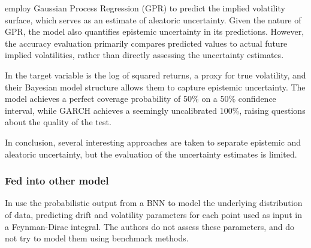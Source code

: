 \textcite{tegner2021probabilistic} employ Gaussian Process Regression (GPR) to predict the implied volatility surface, which serves as an estimate of aleatoric uncertainty. Given the nature of GPR, the model also quantifies epistemic uncertainty in its predictions. However, the accuracy evaluation primarily compares predicted values to actual future implied volatilities, rather than directly assessing the uncertainty estimates.

In \textcite{Parker2021BayesianHeteroskedastic} the target variable is the log of squared returns, a proxy for true volatility, and their Bayesian model structure allows them to capture epistemic uncertainty. The model achieves a perfect coverage probability of 50\% on a 50\% confidence interval, while GARCH achieves a seemingly uncalibrated 100\%, raising questions about the quality of the test.

In conclusion, several interesting approaches are taken to separate epistemic and aleatoric uncertainty, but the evaluation of the uncertainty estimates is limited. 

\subsubsection{Fed into other model}

In \textcite{soleymani2022longterm} use the probabilistic output from a BNN to model the underlying distribution of data, predicting drift and volatility parameters for each point used as input in a Feynman-Dirac integral. The authors do not assess these parameters, and do not try to model them using benchmark methods. 

